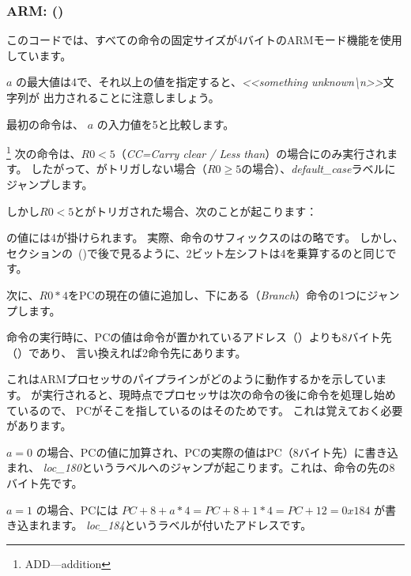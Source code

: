 ﻿\subsubsection{ARM: \OptimizingKeilVI (\ARMMode)}
\label{sec:SwitchARMLot}



このコードでは、すべての命令の固定サイズが4バイトのARMモード機能を使用しています。

$a$ の最大値は4で、それ以上の値を指定すると、\emph{<<something unknown\textbackslash{}n>>}文字列が
出力されることに注意しましょう。

最初の命令は、 $a$ の入力値を5と比較します。

\footnote{ADD---addition}
次の命令は、$R0 < 5$（\emph{CC=Carry clear / Less than}）の場合にのみ実行されます。
したがって、がトリガしない場合（$R0 \geq 5$の場合）、\emph{default\_case}ラベルにジャンプします。

しかし$R0 < 5$とがトリガされた場合、次のことが起こります：

の値には4が掛けられます。
実際、命令のサフィックスのはの略です。
しかし、セクション\q{\ShiftsSectionName}の~()で後で見るように、2ビット左シフトは4を乗算するのと同じです。

次に、$R0*4$を\ac{PC}の現在の値に追加し、下にある（\emph{Branch}）命令の1つにジャンプします。

命令の実行時に、\ac{PC}の値は命令が置かれているアドレス（）よりも8バイト先（）であり、
言い換えれば2命令先にあります。


これはARMプロセッサのパイプラインがどのように動作するかを示しています。
が実行されると、現時点でプロセッサは次の命令の後に命令を処理し始めているので、
\ac{PC}がそこを指しているのはそのためです。 
これは覚えておく必要があります。

$a=0$ の場合、\ac{PC}の値に加算され、\ac{PC}の実際の値は\ac{PC}（8バイト先）に書き込まれ、
\emph{loc\_180}というラベルへのジャンプが起こります。これは、命令の先の8バイト先です。

$a=1$ の場合、\ac{PC}には $PC+8+a*4 = PC+8+1*4 = PC+12 = 0x184$ が書き込まれます。
\emph{loc\_184}というラベルが付いたアドレスです。

